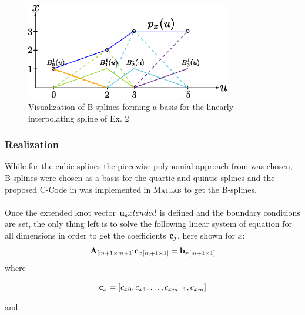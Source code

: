 \begin{figure}[H]
	\centering
    \includegraphics[width = 0.8\textwidth]{graphics/BSpline.eps}
  \caption{Visualization of B-splines forming a basis for the linearly interpolating spline of Ex. 2}
  \label{fig:BSpline}
\end{figure} 

\subsubsection{Realization}
While for the cubic splines the piecewise polynomial approach from \cite{engeln} was chosen, B-splines were chosen as a basis for the quartic and quintic splines and the proposed C-Code in \cite{biagiotti} was implemented in \textsc{Matlab} to get the B-splines.\\
\\


Once the extended knot vector ${\bf u}_extended$ is defined and the boundary conditions are set, the only thing left is to solve the following linear system of equation for all dimensions in order to get the coefficients ${\bf c}_j$,  here shown for $x$:
\begin{equation}
\label{eq:linearSysofEq}
{\bf A}_{[m+1\times m+1] }{{\bf c}_x}_{[m+1\times 1]}={{\bf b}_x}_{[m+1 \times 1]}
\end{equation}
where


\begin{equation*}
    {\bf c}_x = [ {c_x}_{0}, {c_x}_{1}, \ldots, {c_x}_{m-1}, {c_x}_{m}]
\end{equation*}

and

